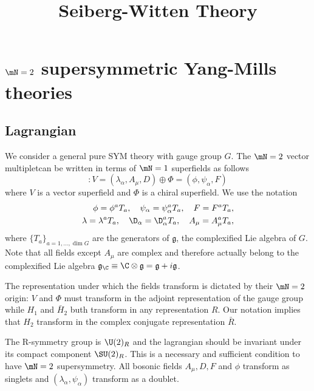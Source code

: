 \documentclass{worksheetclass}
\title{Seiberg-Witten Theory}
\begin{document}
\maketitle

\tableofcontents

\section{$\mN=2$ supersymmetric Yang-Mills theories}

    \subsection{Lagrangian}

        We consider a general pure SYM theory with gauge group $G$. The $\mN=2$ vector multipletcan be written in terms of $\mN=1$ superfields as follows
        \begin{equation}
            [\mN=2 \text{ vector multiplet}] : V=(\lambda_\alpha,A_\mu,D)\oplus \Phi=(\phi,\psi_\alpha,F)
        \end{equation}
        where $V$ is a vector superfield and $\Phi$ is a chiral superfield. We use the notation
        \begin{align}
            \phi=\phi^a T_a,\quad \psi_\alpha=\psi^a_\alpha T_a,\quad F=F^a T_a,\\
            \lambda=\lambda^a T_a,\quad \D_\alpha=\D^a_\alpha T_a,\quad A_\mu=A^a_\mu T_a,
        \end{align}
        where $\{T_a\}_{a=1,\dots,\dim G}$ are the generators of $\mathfrak{g}$, the complexified Lie algebra of $G$. Note that all fields except $A_\mu$ are complex and therefore actually belong to the complexified Lie algebra $\mathfrak{g}_\C\equiv\C\otimes\mathfrak{g}=\mathfrak{g}+i\mathfrak{g}$.
        
        The representation under which the fields transform is dictated by their $\mN=2$ origin: $V$ and $\Phi$ must transform in the adjoint representation of the gauge group while $H_1$ and $\bar{H}_2$ buth transform in any representation $R$. Our notation implies that $H_2$ transform in the complex conjugate representation $\bar{R}$.

        The R-symmetry group is $\U(2)_R$ and the lagrangian should be invariant under its compact component $\SU(2)_R$. This is a necessary and sufficient condition to have $\mN=2$ supersymmetry. All bosonic fields $A_\mu,D,F$ and $\phi$ transform as singlets and $(\lambda_\alpha,\psi_\alpha)$ transform as a doublet.
\end{document}
